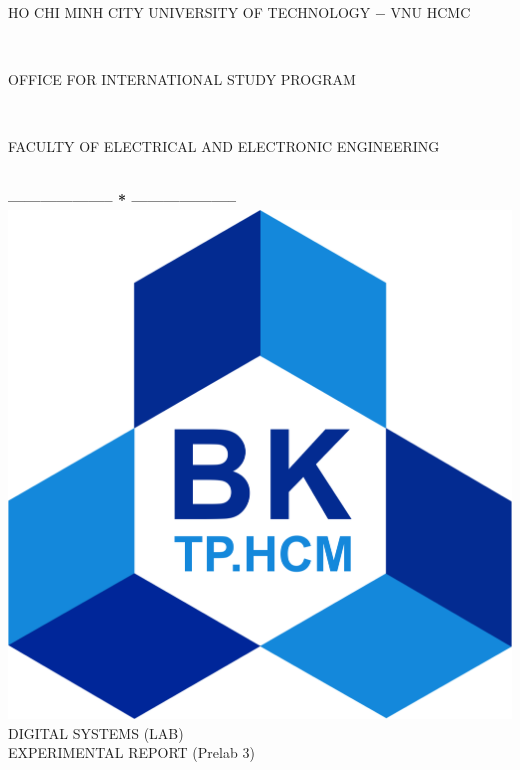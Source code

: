 \documentclass[13pt,a4paper]{report}
\begin{document}
\fontsize{13pt}{18pt}\selectfont
\begin{titlepage}
\thispagestyle{empty}
\thisfancypage{%
\setlength{\fboxsep}{0pt}%
\fbox}{} %
\

\begin{center}
\begin{large}
HO CHI MINH CITY UNIVERSITY OF TECHNOLOGY $-$ VNU HCMC
\end{large} \\
\begin{large}
OFFICE FOR INTERNATIONAL STUDY PROGRAM
\end{large} \\
\begin{large}
FACULTY OF ELECTRICAL AND ELECTRONIC ENGINEERING
\end{large} \\
\textbf{--------------------  *  --------------------}\\[4cm]
\includegraphics[scale=0.1]{logobk.png}\\[1cm]
{\fontsize{20pt}{1}\selectfont DIGITAL SYSTEMS (LAB)}\\
{\fontsize{20pt}{1}\selectfont EXPERIMENTAL REPORT (Prelab 3)}\\[2.5cm]
\end{center}


\end{titlepage}
\end{document}

